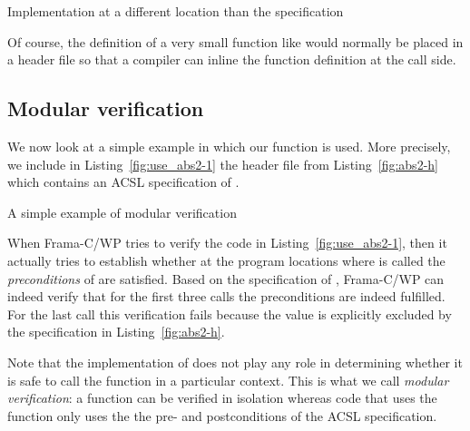 \begin{listing}[hbt]
\begin{minipage}{\textwidth}

\end{minipage}
\caption{\label{fig:abs2-c} Implementation at a different location than the specification}
\end{listing}

Of course, the definition of a very small function like  would normally
be placed in a header file so that a compiler can inline the function definition
at the call side.

\clearpage

\subsection{Modular verification}

We now look at a simple example in which our function  is used.
More precisely, we include in Listing~\ref{fig:use_abs2-1} the
header file from Listing~\ref{fig:abs2-h} which contains an ACSL specification of .

\begin{listing}[hbt]
\begin{minipage}{\textwidth}

\end{minipage}
\caption{\label{fig:use_abs2-1} A simple example of modular verification}
\end{listing}

\FloatBarrier

When Frama-C\slash WP tries to verify the code in Listing~\ref{fig:use_abs2-1},
then it actually tries to establish whether at the program locations where  
is called the \emph{preconditions} of  are satisfied.
Based on the specification of ,
Frama-C\slash WP can indeed verify that for the first three calls 
the preconditions are indeed fulfilled.
For the last call this verification fails because the value 
is explicitly excluded by the specification in Listing~\ref{fig:abs2-h}.

Note that the implementation of  does not play any role in determining
whether it is safe to call the function in a particular context.
This is what we call \emph{modular verification}: a function can be verified in
isolation whereas code that uses the function only uses the the pre- and postconditions
of the ACSL specification.

